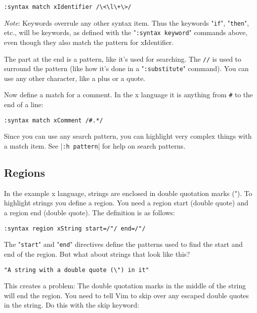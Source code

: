 \begin{Verbatim}[samepage=true]
 :syntax match xIdentifier /\<\l\+\>/
\end{Verbatim}
 
\emph{Note}: Keywords overrule any other syntax item.
Thus the keywords "\verb!if!", "\verb!then!", etc., will be keywords, as defined with the "\verb!:syntax keyword!" commands above, even though they also match the pattern for xIdentifier.

The part at the end is a pattern, like it's used for searching.
The \verb!//! is used to surround the pattern (like how it's done in a "\verb!:substitute!" command).
You can use any other character, like a plus or a quote.

Now define a match for a comment.
In the x language it is anything from \verb!#! to the end of a line:

\begin{Verbatim}[samepage=true]
 :syntax match xComment /#.*/
\end{Verbatim}

Since you can use any search pattern, you can highlight very complex things with a match item.
See |\verb!:h pattern!| for help on search patterns.
\subsection{Regions}

In the example x language, strings are enclosed in double quotation marks (").
To highlight strings you define a region.
You need a region start (double quote) and a region end (double quote).
The definition is as follows:

\begin{Verbatim}[samepage=true]
 :syntax region xString start=/"/ end=/"/
\end{Verbatim}

The "\verb!start!" and "\verb!end!" directives define the patterns used to find the start and end of the region.
But what about strings that look like this?

\begin{Verbatim}[samepage=true]
    "A string with a double quote (\") in it" 
\end{Verbatim}

This creates a problem: The double quotation marks in the middle of the string will end the region.
You need to tell Vim to skip over any escaped double quotes in the string.
Do this with the skip keyword:

